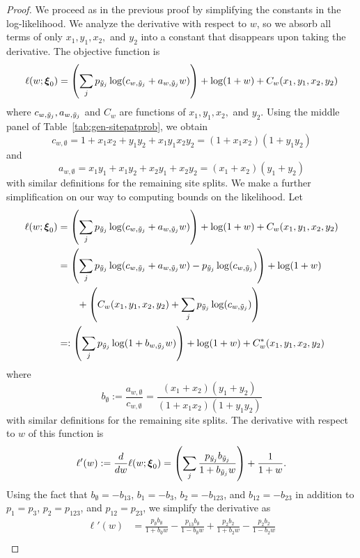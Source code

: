 \begin{proof}
We proceed as in the previous proof by simplifying the constants in the log-likelihood.
We analyze the derivative with respect to $w$, so we absorb all terms of only $x_1,y_1,x_2,$ and $y_2$ into a constant that disappears upon taking the derivative.
The objective function is
\begin{align*}
\ell(w; \boldsymbol\xi_0) = \left(\sum_j p_{\tilde{y}_j} \log(c_{w,\tilde{y}_j} + a_{w,\tilde{y}_j}w)\right) + \log(1+w) + C_w(x_1,y_1,x_2,y_2)
\end{align*}
where $c_{w,\tilde{y}_j},a_{w,\tilde{y}_j}$ and $C_w$ are functions of $x_1,y_1,x_2,$ and $y_2$.
Using the middle panel of Table~\ref{tab:gen-sitepatprob}, we obtain
\[
c_{w,\emptyset} = 1+x_1x_2+y_1y_2+x_1y_1x_2y_2 = (1+x_1x_2)(1+y_1y_2)
\]
and
\[
a_{w,\emptyset} = x_1y_1+x_1y_2+x_2y_1+x_2y_2 = (x_1+x_2)(y_1+y_2)
\]
with similar definitions for the remaining site splits.
We make a further simplification on our way to computing bounds on the likelihood.
Let
\begin{align*}
\ell(w; \boldsymbol\xi_0) &= \left(\sum_j p_{\tilde{y}_j} \log(c_{w,\tilde{y}_j} + a_{w,\tilde{y}_j}w)\right) + \log(1+w) + C_w(x_1,y_1,x_2,y_2) \\
        &= \left(\sum_j p_{\tilde{y}_j} \log(c_{w,\tilde{y}_j} + a_{w,\tilde{y}_j}w) - p_{\tilde{y}_j} \log(c_{w,\tilde{y}_j})\right) + \log(1+w) \\
        &\qquad + \left(C_w(x_1,y_1,x_2,y_2) + \sum_j p_{\tilde{y}_j} \log(c_{w,\tilde{y}_j})\right) \\
        &=: \left(\sum_j p_{\tilde{y}_j} \log(1 + b_{w,\tilde{y}_j}w)\right) + \log(1+w) + C^*_w(x_1,y_1,x_2,y_2)
\end{align*}
where
\[
b_{\emptyset} := \frac{a_{w,\emptyset}}{c_{w,\emptyset}} = \frac{(x_1+x_2)(y_1+y_2)}{(1+x_1x_2)(1+y_1y_2)}
\]
with similar definitions for the remaining site splits.
The derivative with respect to $w$ of this function is
\begin{align*}
\ell'(w) := \frac{d}{dw} \ell(w; \boldsymbol\xi_0) =  \left(\sum_j \frac{p_{\tilde{y}_j}b_{\tilde{y}_j}}{1 + b_{\tilde{y}_j}w}\right) + \frac{1}{1+w}.
\end{align*}
Using the fact that $b_{\emptyset} = -b_{13}$, $b_{1} = -b_{3}$, $b_{2} = -b_{123}$, and $b_{12} = -b_{23}$ in addition to $p_{1} = p_{3}$, $p_{2} = p_{123}$, and $p_{12} = p_{23}$, we simplify the derivative as
\begin{align*}
\ell'(w) &=  \frac{p_{\emptyset}b_{\emptyset}}{1 + b_{\emptyset}w} - \frac{p_{13}b_{\emptyset}}{1 - b_{\emptyset}w} + \frac{p_{2}b_{2}}{1 + b_{2}w} - \frac{p_{2}b_{2}}{1 - b_{2}w} \\

\end{align*}
\end{proof}
